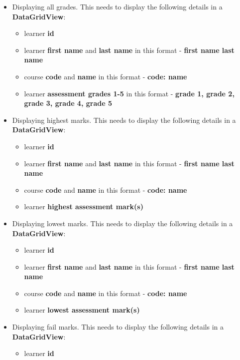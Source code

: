 \documentclass{article}
\begin{document}
\begin{itemize}
\begin{itemize}
\begin{itemize}
        \end{itemize}
        \item Displaying all grades. This needs to display the following details in a \textbf{DataGridView}:
        \begin{itemize}
            \item learner \textbf{id}
            \item learner \textbf{first name} and \textbf{last name} in this format - \textbf{first name last name}
            \item course \textbf{code} and \textbf{name} in this format - \textbf{code: name}
            \item learner  \textbf{assessment grades 1-5} in this format - \textbf{grade 1, grade 2, grade 3, grade 4, grade 5}
        \end{itemize}
        \item Displaying highest marks. This needs to display the following details in a \textbf{DataGridView}:
        \begin{itemize}
            \item learner \textbf{id}
            \item learner \textbf{first name} and \textbf{last name} in this format - \textbf{first name last name}
            \item course \textbf{code} and \textbf{name} in this format - \textbf{code: name}
            \item learner \textbf{highest assessment mark(s)}
        \end{itemize}
        \item Displaying lowest marks. This needs to display the following details in a \textbf{DataGridView}:
        \begin{itemize}
            \item learner \textbf{id}
            \item learner \textbf{first name} and \textbf{last name} in this format - \textbf{first name last name}
            \item course \textbf{code} and \textbf{name} in this format - \textbf{code: name}
            \item learner \textbf{lowest assessment mark(s)}
        \end{itemize}
        \item Displaying fail marks. This needs to display the following details in a \textbf{DataGridView}:
        \begin{itemize}
            \item learner \textbf{id}

\end{itemize}
\end{itemize}
\end{itemize}
\end{document}

